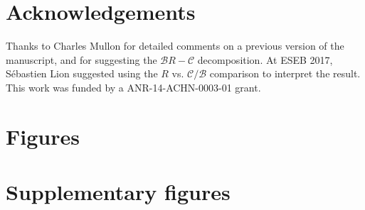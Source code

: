 \documentclass[11pt, letterpaper]{article}
\begin{document}
\section*{Acknowledgements}
Thanks to Charles Mullon for detailed comments on a previous version of the manuscript, and for suggesting the $\mathcal{B} R - \mathcal{C}$ decomposition. At ESEB 2017, S\'ebastien Lion suggested using the $R$ vs. $\mathcal{C}/\mathcal{B}$ comparison to interpret the result. This work was funded by a ANR-14-ACHN-0003-01 grant. 

\singlespacing
\clearpage


\doublespacing



\clearpage
\setcounter{figure}{0}
\section*{Figures}




\clearpage


\appendix

\renewcommand{\theequation}{A\arabic{equation}}
\renewcommand{\thetable}{A\arabic{table}}
\renewcommand{\thefigure}{A\arabic{figure}}
\setcounter{equation}{0}  %
\setcounter{figure}{0}
\setcounter{table}{0}
 
\section*{Supplementary figures} 
\end{document}
